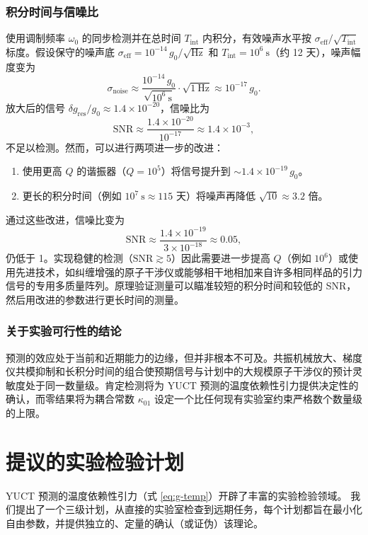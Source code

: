 \documentclass[12pt]{article}
\theoremstyle{remark}
\begin{document}
	\subsubsection{积分时间与信噪比}
	使用调制频率 $\omega_0$ 的同步检测并在总时间 $T_{\mathrm{int}}$ 内积分，有效噪声水平按 $\sigma_{\mathrm{eff}} / \sqrt{T_{\mathrm{int}}}$ 标度。假设保守的噪声底 $\sigma_{\mathrm{eff}} = 10^{-14}\,g_0/\sqrt{\mathrm{Hz}}$ 和 $T_{\mathrm{int}} = 10^6\ \mathrm{s}$（约 12 天），噪声幅度变为
	\[
	\sigma_{\mathrm{noise}} \approx \frac{10^{-14}\,g_0}{\sqrt{10^6\ \mathrm{s}}} \cdot \sqrt{1\ \mathrm{Hz}} \approx 10^{-17}\,g_0.
	\]
	放大后的信号 $\delta g_{\mathrm{res}}/g_0 \approx 1.4\times10^{-20}$，信噪比为
	\[
	\mathrm{SNR} \approx \frac{1.4\times10^{-20}}{10^{-17}} \approx 1.4\times10^{-3},
	\]
	不足以检测。然而，可以进行两项进一步的改进：
	\begin{enumerate}
		\item 使用更高 $Q$ 的谐振器（$Q = 10^5$）将信号提升到 $\sim 1.4\times10^{-19}\,g_0$。
		\item 更长的积分时间（例如 $10^7\ \mathrm{s} \approx 115$ 天）将噪声再降低 $\sqrt{10} \approx 3.2$ 倍。
	\end{enumerate}
	通过这些改进，信噪比变为
	\[
	\mathrm{SNR} \approx \frac{1.4\times10^{-19}}{3\times10^{-18}} \approx 0.05,
	\]
	仍低于 1。实现稳健的检测（$\mathrm{SNR} \gtrsim 5$）因此需要进一步提高 $Q$（例如 $10^6$）或使用先进技术，如纠缠增强的原子干涉仪或能够相干地相加来自许多相同样品的引力信号的专用多质量阵列。原理验证测量可以瞄准较短的积分时间和较低的 SNR，然后用改进的参数进行更长时间的测量。
	
	\subsubsection{关于实验可行性的结论}
	预测的效应处于当前和近期能力的边缘，但并非根本不可及。共振机械放大、梯度仪共模抑制和长积分时间的组合使预期信号与计划中的大规模原子干涉仪的预计灵敏度处于同一数量级。肯定检测将为 YUCT 预测的温度依赖性引力提供决定性的确认，而零结果将为耦合常数 $\kappa_{01}$ 设定一个比任何现有实验室约束严格数个数量级的上限。
	
	\section{提议的实验检验计划}
	\label{sec:experiments}
	
	YUCT 预测的温度依赖性引力（式 \ref{eq:g-temp}）开辟了丰富的实验检验领域。
	我们提出了一个三级计划，从直接的实验室检查到远期任务，每个计划都旨在最小化自由参数，并提供独立的、定量的确认（或证伪）该理论。
	
\end{document}
